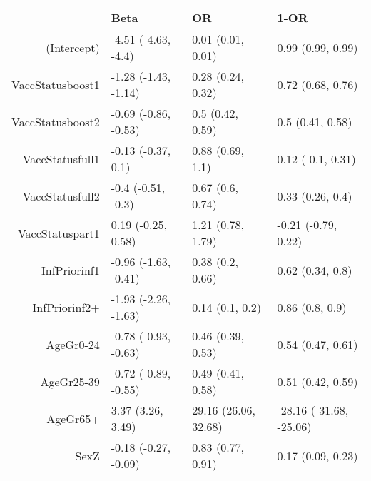 \begin{table}[ht]
\centering
\begin{tabular}{rlll}
  \hline
 & Beta & OR & 1-OR \\ 
  \hline
(Intercept) & -4.51 (-4.63, -4.4) & 0.01 (0.01, 0.01) & 0.99 (0.99, 0.99) \\ 
  VaccStatusboost1 & -1.28 (-1.43, -1.14) & 0.28 (0.24, 0.32) & 0.72 (0.68, 0.76) \\ 
  VaccStatusboost2 & -0.69 (-0.86, -0.53) & 0.5 (0.42, 0.59) & 0.5 (0.41, 0.58) \\ 
  VaccStatusfull1 & -0.13 (-0.37, 0.1) & 0.88 (0.69, 1.1) & 0.12 (-0.1, 0.31) \\ 
  VaccStatusfull2 & -0.4 (-0.51, -0.3) & 0.67 (0.6, 0.74) & 0.33 (0.26, 0.4) \\ 
  VaccStatuspart1 & 0.19 (-0.25, 0.58) & 1.21 (0.78, 1.79) & -0.21 (-0.79, 0.22) \\ 
  InfPriorinf1 & -0.96 (-1.63, -0.41) & 0.38 (0.2, 0.66) & 0.62 (0.34, 0.8) \\ 
  InfPriorinf2+ & -1.93 (-2.26, -1.63) & 0.14 (0.1, 0.2) & 0.86 (0.8, 0.9) \\ 
  AgeGr0-24 & -0.78 (-0.93, -0.63) & 0.46 (0.39, 0.53) & 0.54 (0.47, 0.61) \\ 
  AgeGr25-39 & -0.72 (-0.89, -0.55) & 0.49 (0.41, 0.58) & 0.51 (0.42, 0.59) \\ 
  AgeGr65+ & 3.37 (3.26, 3.49) & 29.16 (26.06, 32.68) & -28.16 (-31.68, -25.06) \\ 
  SexZ & -0.18 (-0.27, -0.09) & 0.83 (0.77, 0.91) & 0.17 (0.09, 0.23) \\ 
   \hline
\end{tabular}
\end{table}

